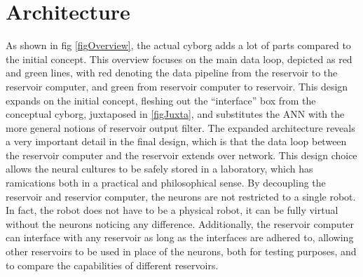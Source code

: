 \section{Architecture}
As shown in fig \ref{figOverview}, the actual cyborg adds a lot of parts
compared to the initial concept.
This overview focuses on the main data loop, depicted as red and green lines,
with red denoting the data pipeline from the reservoir to the reservoir
computer, and green from reservoir computer to reservoir.
This design expands on the initial concept, fleshing out the ``interface'' box
from the conceptual cyborg, juxtaposed in \ref{figJuxta}, and substitutes the
ANN with the more general notions of reservoir output filter.
The expanded architecture reveals a very important detail in the final design,
which is that the data loop between the reservoir computer and the reservoir
extends over network.
This design choice allows the neural cultures to be safely stored in a
laboratory, which has ramications both in a practical and philosophical sense.
By decoupling the reservoir and reservior computer, the neurons are not
restricted to a single robot.
In fact, the robot does not have to be a physical robot, it can be fully virtual
without the neurons noticing any difference.
Additionally, the reservoir computer can interface with any reservoir as long as
the interfaces are adhered to, allowing other reservoirs to be used in place of
the neurons, both for testing purposes, and to compare the capabilities of
different reservoirs.
